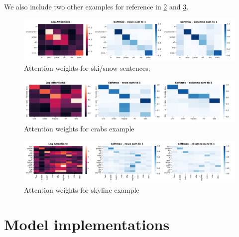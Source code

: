 \documentclass[12pt]{article}
\begin{document}
We also include two other examples for reference in \cref{fig:crabs} and
\cref{fig:skyline}.


\begin{figure}[h]
\centering
\includegraphics[width=\textwidth]{figs/ski-snow.pdf}
\caption{Attention weights for ski/snow sentences.}
\label{fig:skisnow}
\end{figure}

\begin{figure}[h]
\centering
\includegraphics[width=\textwidth]{figs/crabs.pdf}
\caption{Attention weights for crabs example}
\label{fig:crabs}
\end{figure}

\begin{figure}[h]
\centering
\includegraphics[width=\textwidth]{figs/skyline.pdf}
\caption{Attention weights for skyline example}
\label{fig:skyline}
\end{figure}




\appendix
\section{Model implementations}






\end{document}
